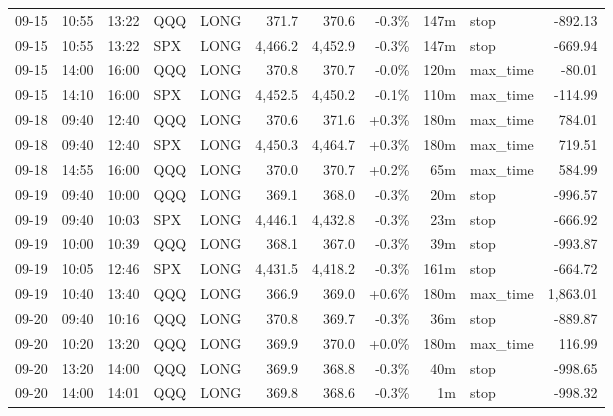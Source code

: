 \documentclass[11pt,a4paper,twoside]{article}
\begin{document}
\begin{center}
\begin{longtable}{>{\color{txtmain}}l l l l l r r r r >{\color{txtmain}}l r}
09-15 & 10:55 & 13:22 & QQQ & LONG & 371.7 & 370.6 & \textcolor{lossred}{-0.3\%} & 147m & stop & \textcolor{lossred}{-892.13} \\
09-15 & 10:55 & 13:22 & SPX & LONG & 4,466.2 & 4,452.9 & \textcolor{lossred}{-0.3\%} & 147m & stop & \textcolor{lossred}{-669.94} \\
09-15 & 14:00 & 16:00 & QQQ & LONG & 370.8 & 370.7 & \textcolor{lossred}{-0.0\%} & 120m & max\_time & \textcolor{lossred}{-80.01} \\
09-15 & 14:10 & 16:00 & SPX & LONG & 4,452.5 & 4,450.2 & \textcolor{lossred}{-0.1\%} & 110m & max\_time & \textcolor{lossred}{-114.99} \\
09-18 & 09:40 & 12:40 & QQQ & LONG & 370.6 & 371.6 & \textcolor{wingreen}{+0.3\%} & 180m & max\_time & \textcolor{wingreen}{784.01} \\
09-18 & 09:40 & 12:40 & SPX & LONG & 4,450.3 & 4,464.7 & \textcolor{wingreen}{+0.3\%} & 180m & max\_time & \textcolor{wingreen}{719.51} \\
09-18 & 14:55 & 16:00 & QQQ & LONG & 370.0 & 370.7 & \textcolor{wingreen}{+0.2\%} & 65m & max\_time & \textcolor{wingreen}{584.99} \\
09-19 & 09:40 & 10:00 & QQQ & LONG & 369.1 & 368.0 & \textcolor{lossred}{-0.3\%} & 20m & stop & \textcolor{lossred}{-996.57} \\
09-19 & 09:40 & 10:03 & SPX & LONG & 4,446.1 & 4,432.8 & \textcolor{lossred}{-0.3\%} & 23m & stop & \textcolor{lossred}{-666.92} \\
09-19 & 10:00 & 10:39 & QQQ & LONG & 368.1 & 367.0 & \textcolor{lossred}{-0.3\%} & 39m & stop & \textcolor{lossred}{-993.87} \\
09-19 & 10:05 & 12:46 & SPX & LONG & 4,431.5 & 4,418.2 & \textcolor{lossred}{-0.3\%} & 161m & stop & \textcolor{lossred}{-664.72} \\
09-19 & 10:40 & 13:40 & QQQ & LONG & 366.9 & 369.0 & \textcolor{wingreen}{+0.6\%} & 180m & max\_time & \textcolor{wingreen}{1,863.01} \\
09-20 & 09:40 & 10:16 & QQQ & LONG & 370.8 & 369.7 & \textcolor{lossred}{-0.3\%} & 36m & stop & \textcolor{lossred}{-889.87} \\
09-20 & 10:20 & 13:20 & QQQ & LONG & 369.9 & 370.0 & \textcolor{wingreen}{+0.0\%} & 180m & max\_time & \textcolor{wingreen}{116.99} \\
09-20 & 13:20 & 14:00 & QQQ & LONG & 369.9 & 368.8 & \textcolor{lossred}{-0.3\%} & 40m & stop & \textcolor{lossred}{-998.65} \\
09-20 & 14:00 & 14:01 & QQQ & LONG & 369.8 & 368.6 & \textcolor{lossred}{-0.3\%} & 1m & stop & \textcolor{lossred}{-998.32} \\

\end{longtable}
\end{center}
\end{document}
